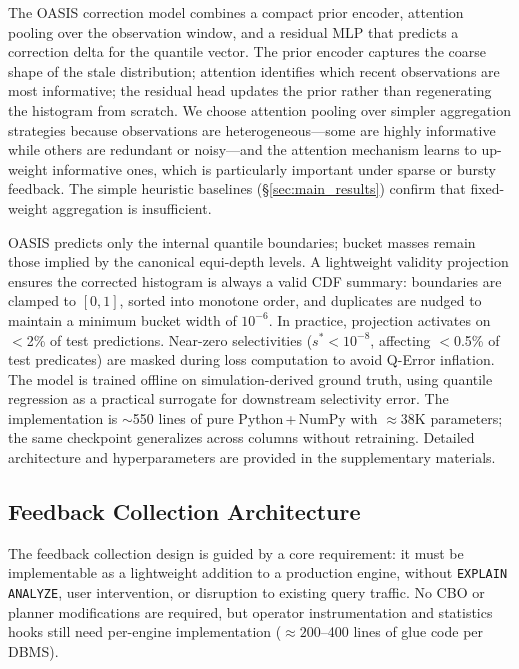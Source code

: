 \documentclass[runningheads]{llncs}
\begin{document}
The OASIS correction model combines a compact prior encoder, attention pooling over the observation window, and a residual MLP that predicts a correction delta for the quantile vector. The prior encoder captures the coarse shape of the stale distribution; attention identifies which recent observations are most informative; the residual head updates the prior rather than regenerating the histogram from scratch.
We choose attention pooling over simpler aggregation strategies because observations are heterogeneous---some are highly informative while others are redundant or noisy---and the attention mechanism learns to up-weight informative ones, which is particularly important under sparse or bursty feedback. The simple heuristic baselines (\S\ref{sec:main_results}) confirm that fixed-weight aggregation is insufficient.

OASIS predicts only the internal quantile boundaries; bucket masses remain those implied by the canonical equi-depth levels. A lightweight validity projection ensures the corrected histogram is always a valid CDF summary: boundaries are clamped to $[0,1]$, sorted into monotone order, and duplicates are nudged to maintain a minimum bucket width of $10^{-6}$. In practice, projection activates on $<$2\% of test predictions. Near-zero selectivities ($s^* < 10^{-8}$, affecting $<$0.5\% of test predicates) are masked during loss computation to avoid Q-Error inflation.
The model is trained offline on simulation-derived ground truth, using quantile regression as a practical surrogate for downstream selectivity error. The implementation is $\sim$550 lines of pure Python\,+\,NumPy with $\approx$38K parameters; the same checkpoint generalizes across columns without retraining. Detailed architecture and hyperparameters are provided in the supplementary materials.

\subsection{Feedback Collection Architecture}
\label{sec:feedback}

The feedback collection design is guided by a core requirement: it must be implementable as a lightweight addition to a production engine, without \texttt{EXPLAIN ANALYZE}, user intervention, or disruption to existing query traffic. No CBO or planner modifications are required, but operator instrumentation and statistics hooks still need per-engine implementation (${\approx}200$--400 lines of glue code per DBMS).
\end{document}
